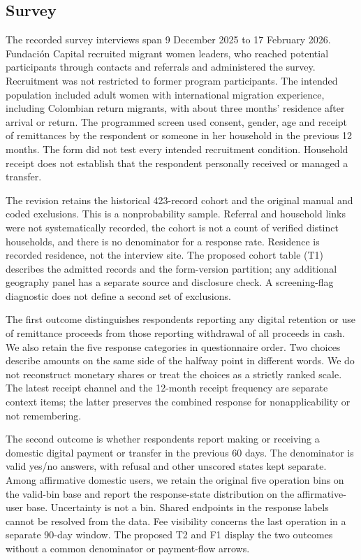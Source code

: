 \documentclass[12pt]{article}
\begin{document}
\subsection{Survey}

The recorded survey interviews span 9 December 2025 to 17 February 2026. Fundación Capital recruited migrant women leaders, who reached potential participants through contacts and referrals and administered the survey. Recruitment was not restricted to former program participants. The intended population included adult women with international migration experience, including Colombian return migrants, with about three months' residence after arrival or return. The programmed screen used consent, gender, age and receipt of remittances by the respondent or someone in her household in the previous 12 months. The form did not test every intended recruitment condition. Household receipt does not establish that the respondent personally received or managed a transfer.

The revision retains the historical 423-record cohort and the original manual and coded exclusions. This is a nonprobability sample. Referral and household links were not systematically recorded, the cohort is not a count of verified distinct households, and there is no denominator for a response rate. Residence is recorded residence, not the interview site. The proposed cohort table (T1) describes the admitted records and the form-version partition; any additional geography panel has a separate source and disclosure check. A screening-flag diagnostic does not define a second set of exclusions.

The first outcome distinguishes respondents reporting any digital retention or use of remittance proceeds from those reporting withdrawal of all proceeds in cash. We also retain the five response categories in questionnaire order. Two choices describe amounts on the same side of the halfway point in different words. We do not reconstruct monetary shares or treat the choices as a strictly ranked scale. The latest receipt channel and the 12-month receipt frequency are separate context items; the latter preserves the combined response for nonapplicability or not remembering.

The second outcome is whether respondents report making or receiving a domestic digital payment or transfer in the previous 60 days. The denominator is valid yes/no answers, with refusal and other unscored states kept separate. Among affirmative domestic users, we retain the original five operation bins on the valid-bin base and report the response-state distribution on the affirmative-user base. Uncertainty is not a bin. Shared endpoints in the response labels cannot be resolved from the data. Fee visibility concerns the last operation in a separate 90-day window. The proposed T2 and F1 display the two outcomes without a common denominator or payment-flow arrows.
\end{document}
